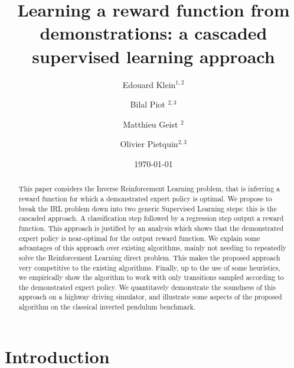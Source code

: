 \documentclass[smallextended]{svjour3}
\begin{document}
\title{Learning a reward function from demonstrations: a cascaded supervised learning approach}
\author{Edouard Klein$^{1,2}$ \and Bilal Piot $^{2,3}$\and Matthieu Geist $^{2}$\and Olivier Pietquin$^{2,3}$}
\date{\today}


\maketitle

\begin{abstract}
  This paper considers the Inverse Reinforcement Learning problem, that is inferring a reward function for which a demonstrated expert policy is optimal.
We propose to break the IRL problem down into two generic Supervised Learning steps: this is the cascaded approach. A classification step followed by a regression step output a reward function.
This approach is justified by an analysis which shows that the demonstrated expert policy is near-optimal for the output reward function. We explain some advantages of this approach over existing algorithms, mainly not needing to repeatedly solve the Reinforcement Learning direct problem. This makes the proposed approach very competitive to the existing algorithms.
Finally, up to the use of some heuristics, we empirically show the algorithm to work with only transitions sampled according to the demonstrated expert policy. We quantitavely demonstrate the soundness of this approach on a highway driving simulator, and illustrate some aspects of the proposed algorithm on the classical inverted pendulum benchmark.
  \end{abstract}
\section{Introduction}
\label{sec-2}
\end{document}
